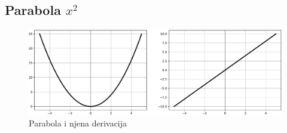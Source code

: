 \documentclass[times, utf8, numeric, diplomski]{fer}
\def\otherwise{\textit{inače}}
\begin{document}
%

\iffalse %
\subsection{Parabola $x^2$}

\begin{figure}[H]
\includegraphics[width=\textwidth]{func_Pow2.pdf}
\centering
\caption{Parabola i njena derivacija}
\end{figure}
\end{document}
